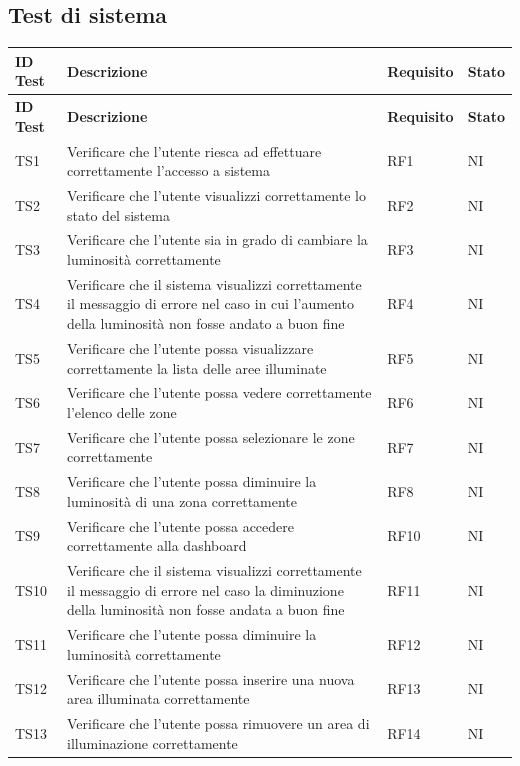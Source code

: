 \documentclass[12pt]{article}
\begin{document}
\subsection{Test di sistema}
\begin{xltabular}{\linewidth}{|>{\hsize}X|>{\hsize}X|>{\hsize}X|>{\hsize}X|}

	\hline
	\textbf{ID Test} & \textbf{Descrizione} & \textbf{Requisito} & \textbf{Stato} \\
	\hline
	\endfirsthead
	\hline
	\textbf{ID Test} & \textbf{Descrizione} & \textbf{Requisito} & \textbf{Stato} \\
	\hline
	\endhead
	\hline
	\endfoot
	TS1	 & Verificare che l'utente riesca ad effettuare correttamente l'accesso a sistema	&	RF1	&	NI	\\
	\hline
	TS2	 & Verificare che l'utente visualizzi correttamente lo stato del sistema	&	RF2	&	NI	\\
	\hline
	TS3	 & Verificare che l'utente sia in grado di cambiare la luminosità correttamente	&	RF3	&	NI	\\
	\hline
	TS4	 & Verificare che il sistema visualizzi correttamente il messaggio di errore nel caso in cui l'aumento della luminosità non fosse andato a buon fine 	&	RF4	&	NI	\\
	\hline
	TS5	& Verificare che l'utente possa visualizzare correttamente la lista delle aree illuminate	&	RF5 	&	NI	\\
	\hline
	TS6	& Verificare che l'utente possa vedere correttamente l'elenco delle zone	&	RF6	&	NI	\\
	\hline
	TS7	 & Verificare che l'utente possa selezionare le zone correttamente	&	RF7	&	NI	\\
	\hline
	TS8	 & Verificare che l'utente possa diminuire la luminosità di una zona correttamente	&	RF8	&	NI	\\
	\hline
	TS9	 & Verificare che l'utente possa accedere correttamente alla dashboard	&	RF10	&	NI	\\
	\hline
	TS10	 & Verificare che il sistema visualizzi correttamente il messaggio di errore nel caso la diminuzione della luminosità non fosse andata a buon fine 	&	RF11	&	NI	\\
	\hline
	TS11	 & Verificare che l'utente possa diminuire la luminosità correttamente	&	RF12	&	NI	\\
	\hline
	TS12	 & Verificare che l'utente possa inserire una nuova area illuminata correttamente	&	RF13	&	NI	\\
	\hline
	TS13	 & Verificare che l'utente possa rimuovere un area di illuminazione correttamente	&	RF14	&	NI	\\

\end{xltabular}
\end{document}
